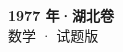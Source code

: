 \documentclass[zihao=-4, a4paper]{ctexart}
\begin{document}
\begin{center}
  {\Large\bfseries 1977 年·湖北卷}\\[4pt]
  {\large 数学 · 试题版}
\end{center}
\medskip
{}

\end{document}

